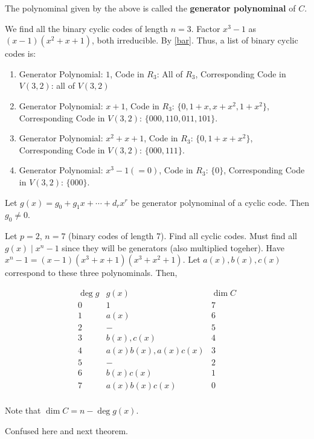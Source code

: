 \documentclass{article}
\begin{document}
\begin{definition}
  The polynominal given by the above is called the \textbf{generator
    polynominal} of \( C \).
\end{definition}
\begin{example}
  We find all the binary cyclic codes of length \( n=3 \). Factor \( x^3-1 \) as \( (x-1)(x^2+x+1) \), both irreducible. By \autoref{bar}. Thus, a list of binary cyclic codes is:
  \begin{enumerate}
    \item Generator Polynomial: \( 1 \), Code in  \( R_3 \): All of \( R_3 \), Corresponding Code in \( V(3, 2) \): all of \( V(3, 2) \)
    \item Generator Polynomial: \( x+1 \), Code in \( R_3 \): \( \{0, 1+x, x+x^2, 1+x^2 \}\), Corresponding Code in \( V(3, 2) \): \( \{000, 110, 011, 101\} \).
    \item Generator Polynomial: \( x^2+x+1 \), Code in \( R_3 \): \( \{0, 1+x+x^2\}\), Corresponding Code in \( V(3, 2) \): \( \{000, 111\} \).
    \item Generator Polynomial: \( x^3-1 (=0) \), Code in \( R_3 \): \( \{0\} \), Corresponding Code in \( V(3, 2) \): \( \{000\} \).
  \end{enumerate}
\end{example}
\begin{lemma}
  Let \( g(x) = g_0 + g_1x + \cdots + d_rx^r \) be generator
  polynominal of a cyclic code. Then \( g_0 \neq 0 \).
\end{lemma}
\begin{example}
  Let \( p=2 \), \( n=7 \) (binary codes of length 7). Find all cyclic codes. Must find all \( g(x) \mid x^n-1 \) since they will be generators (also multiplied togeher). Have \( x^n-1 = (x-1)(x^3+x+1)(x^3+x^2+1) \). Let \( a(x), b(x), c(x) \) correspond to these three polynominals. Then,
  \begin{center}
    \[
      \begin{array}{ c|c|c }
        \deg g & g(x)               & \dim C \\
        \hline
        \hline
        0      & 1                  & 7      \\
        1      & a(x)               & 6      \\
        2      & -                  & 5      \\
        3      & b(x), c(x)         & 4      \\
        4      & a(x)b(x), a(x)c(x) & 3      \\
        5      & -                  & 2      \\
        6      & b(x)c(x)           & 1      \\
        7      & a(x)b(x)c(x)       & 0      \\
      \end{array}
    \]
  \end{center}

  Note that \( \dim C = n - \deg g(x) \).

  Confused here and next theorem.
\end{example}
\end{document}

